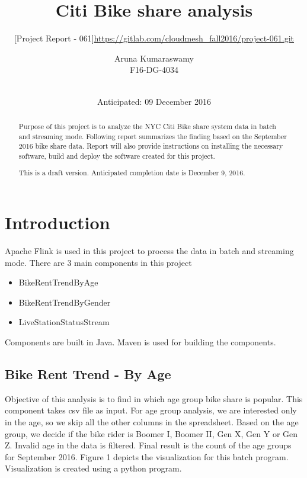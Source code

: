 \documentclass{sig-alternate-05-2015}
\begin{document}
\title{Citi Bike share analysis}  
\subtitle{[Project Report - 061]}
\subtitle{\url{https://gitlab.com/cloudmesh_fall2016/project-061.git}}


\author{
\alignauthor
Aruna Kumaraswamy\\
F16-DG-4034\\
       \\
}
\date{Anticipated: 09 December 2016}

\maketitle

\begin{abstract}
    Purpose of this project is to analyze the NYC Citi Bike share system data in batch and streaming mode. Following report summarizes the finding based on the September 2016 bike share data. Report will also provide instructions on installing the necessary software, build and deploy the software created for this project.
    
    This is a draft version. Anticipated completion date is December 9, 2016.
\end{abstract}


\section{Introduction}
Apache Flink is used in this project to process the data in batch and streaming mode. There are 3 main components in this project
\begin{itemize}
    \item BikeRentTrendByAge
    \item BikeRentTrendByGender
    \item LiveStationStatusStream
\end{itemize}
Components are built in Java. Maven is used for building the components.
\subsection {Bike Rent Trend - By Age}
Objective of this analysis is to find in which age group bike share is popular. This component takes csv file as input. For age group analysis, we are interested only in the age, so we skip all the other columns in the spreadsheet. Based on the age group, we decide if the bike rider is Boomer I, Boomer II, Gen X, Gen Y or Gen Z. Invalid age in the data is filtered. Final result is the count of the age groups for September 2016. Figure 1 depicts the visualization for this batch program. Visualization is created using a python program.
\end{document}
